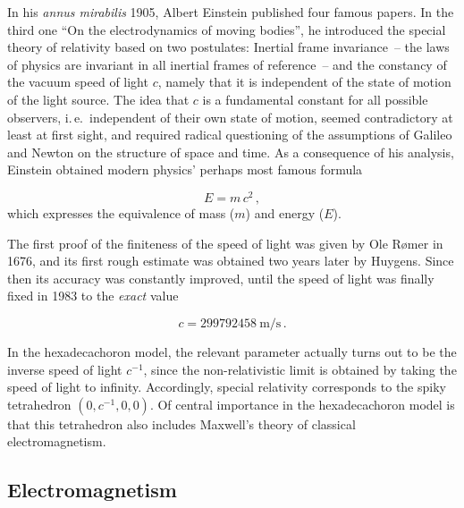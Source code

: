 \documentclass{scrartcl}
\begin{document}
\newpage {}
\label{sec:0100}

In his \emph{annus mirabilis} 1905, Albert Einstein published four famous papers. In the third one \enquote{On the electrodynamics of moving bodies}, he introduced the special theory of relativity based on two postulates: Inertial frame invariance~-- the laws of physics are invariant in all inertial frames of reference~-- and the constancy of the vacuum speed of light $c$, namely that it is independent of the state of motion of the light source. The idea that $c$ is a fundamental constant for all possible observers, i.\,e.\ independent of their own state of motion, seemed contradictory at least at first sight, and required radical questioning of the assumptions of Galileo and Newton on the structure of space and time. As a consequence of his analysis, Einstein obtained modern physics' perhaps most famous formula

\begin{equation*}\label{emc2}
  E=m\,c^2\,,
\end{equation*}
%
which expresses the equivalence of mass ($m$) and energy ($E$).

The first proof of the finiteness of the speed of light was given by Ole Rømer in 1676, and its first rough estimate was obtained two years later by Huygens. Since then its accuracy was constantly improved, until the speed of light was finally fixed in 1983 to the \emph{exact} value

\begin{equation*}
  c=\SI{299 792 458}{\meter \per \second}\,.
\end{equation*}

In the hexadecachoron model, the relevant parameter actually turns out to be the inverse speed of light $c^{-1}$, since the non-relativistic limit is obtained by taking the speed of light to infinity. Accordingly, special relativity corresponds to the spiky tetrahedron $(0, c^{-1}, 0, 0)$. 
Of central importance in the hexadecachoron model is that this tetrahedron also includes Maxwell's theory of classical electromagnetism.






\subsection*{Electromagnetism}
\end{document}
